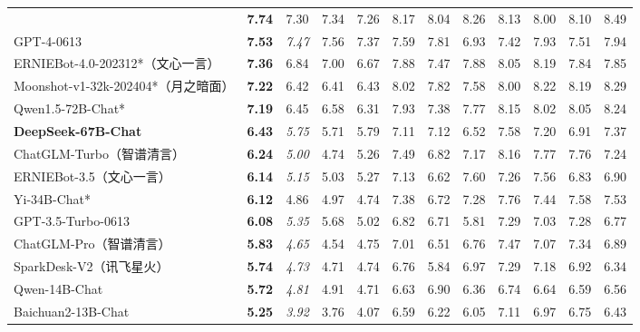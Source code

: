 \begin{table*}[!t]
{\begin{tabular}{@{}l|c|c|cc|c|cccccc@{}}
    \textbf{\dsviisft{}} & \textbf{7.74}&7.30&7.34&7.26&8.17& 8.04 &8.26&8.13&8.00 & 8.10&8.49 \\
    GPT-4-0613 & \textbf{7.53} & \multicolumn{1}{c|}{\textit{7.47}} & 7.56 & 7.37 & \multicolumn{1}{c|}{7.59} & 7.81 & 6.93 & 7.42 & 7.93 & 7.51 & 7.94 \\
    ERNIEBot-4.0-202312*（文心一言） & \textbf{7.36} & 6.84 & 7.00 & 6.67 & 7.88 & 7.47 & 7.88 & 8.05 & 8.19 & 7.84 & 7.85 \\
    Moonshot-v1-32k-202404*（月之暗面） & \textbf{7.22} & 6.42 & 6.41 & 6.43 & 8.02 & 7.82 & 7.58 & 8.00 & 8.22 & 8.19 & 8.29 \\
    Qwen1.5-72B-Chat* & \textbf{7.19} & 6.45 & 6.58 & 6.31 & 7.93 & 7.38 & 7.77 & 8.15 & 8.02 & 8.05 & 8.24\\
    \textbf{DeepSeek-67B-Chat} & \textbf{6.43} & \multicolumn{1}{c|}{\textit{5.75}} & 5.71 & 5.79 & \multicolumn{1}{c|}{7.11} & 7.12 & 6.52 & 7.58 & 7.20 & 6.91 & 7.37 \\
    ChatGLM-Turbo（智谱清言） & \textbf{6.24} & \multicolumn{1}{c|}{\textit{5.00}} & 4.74 & 5.26 & \multicolumn{1}{c|}{7.49} & 6.82 & 7.17 & 8.16 & 7.77 & 7.76 & 7.24 \\
    ERNIEBot-3.5（文心一言） & \textbf{6.14} & \multicolumn{1}{c|}{\textit{5.15}} & 5.03 & 5.27 & \multicolumn{1}{c|}{7.13} & 6.62 & 7.60 & 7.26 & 7.56 & 6.83 & 6.90 \\
    Yi-34B-Chat* & \textbf{6.12} & 4.86 & 4.97 & 4.74 & 7.38 & 6.72 & 7.28 & 7.76 & 7.44 & 7.58 & 7.53 \\
    GPT-3.5-Turbo-0613 & \textbf{6.08} & \multicolumn{1}{c|}{\textit{5.35}} & 5.68 & 5.02 & \multicolumn{1}{c|}{6.82} & 6.71 & 5.81 & 7.29 & 7.03 & 7.28 & 6.77 \\
    ChatGLM-Pro（智谱清言） & \textbf{5.83} & \multicolumn{1}{c|}{\textit{4.65}} & 4.54 & 4.75 & \multicolumn{1}{c|}{7.01} & 6.51 & 6.76 & 7.47 & 7.07 & 7.34 & 6.89 \\
    SparkDesk-V2（讯飞星火） & \textbf{5.74} & \multicolumn{1}{c|}{\textit{4.73}} & 4.71 & 4.74 & \multicolumn{1}{c|}{6.76} & 5.84 & 6.97 & 7.29 & 7.18 & 6.92 & 6.34 \\
    Qwen-14B-Chat & \textbf{5.72} & \multicolumn{1}{c|}{\textit{4.81}} & 4.91 & 4.71 & \multicolumn{1}{c|}{6.63} & 6.90 & 6.36 & 6.74 & 6.64 & 6.59 & 6.56 \\
    Baichuan2-13B-Chat & \textbf{5.25} & \multicolumn{1}{c|}{\textit{3.92}} & 3.76 & 4.07 & \multicolumn{1}{c|}{6.59} & 6.22 & 6.05 & 7.11 & 6.97 & 6.75 & 6.43 \\

\end{tabular}}
\end{table*}
